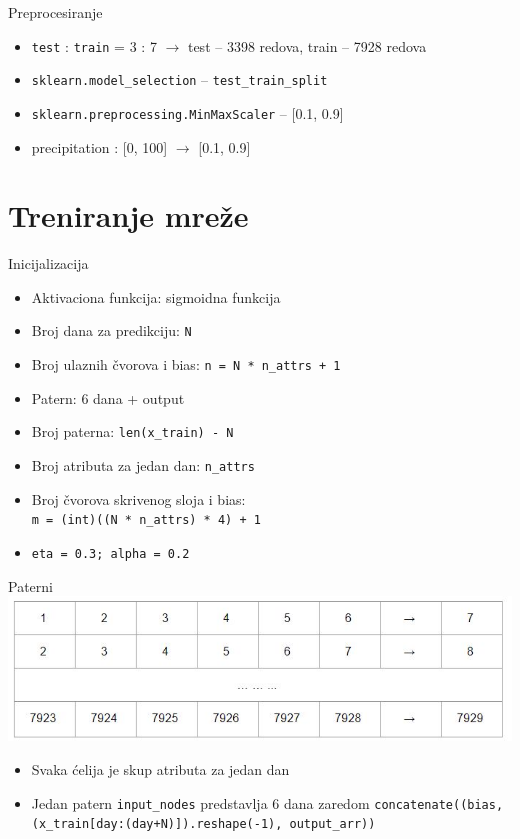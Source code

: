 \documentclass{beamer}
\begin{document}
\begin{frame}{Preprocesiranje}
    \begin{itemize}
        \item \texttt{test} : \texttt{train} = 3 : 7 $\rightarrow $ test -- 3398 redova, train -- 7928 redova
        \item \texttt{sklearn.model\_selection} -- \texttt{test\_train\_split}
        \item \texttt{sklearn.preprocessing.MinMaxScaler} -- [0.1, 0.9]
        \item precipitation : [0, 100] $\rightarrow$  [0.1, 0.9]
    \end{itemize}
\end{frame}

\section{Treniranje mreže}

\begin{frame}{Inicijalizacija}
    
    \begin{itemize}
        \item Aktivaciona funkcija: sigmoidna funkcija
        \item Broj dana za predikciju: \texttt{N}
        \item Broj ulaznih čvorova i bias: \texttt{n = N * n\_attrs + 1}
        \item Patern: 6 dana + output
        \item Broj paterna: \texttt{len(x\_train) - N}
        \item Broj atributa za jedan dan: \texttt{n\_attrs}
        \item Broj čvorova skrivenog sloja i bias:\\ \texttt{m = (int)((N * n\_attrs) * 4) + 1}
        \item \texttt{eta = 0.3; alpha = 0.2}
    \end{itemize}
\end{frame}

\begin{frame}{Paterni}
    \includegraphics[scale=0.75]{dani.JPG}
    \begin{itemize}
        \item Svaka ćelija je skup atributa za jedan dan
        \item Jedan patern \texttt{input\_nodes} predstavlja 6 dana zaredom
        \texttt{concatenate((bias, (x\_train[day:(day+N)]).reshape(-1), output\_arr))}
    \end{itemize}
\end{frame}
\end{document}
